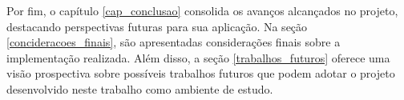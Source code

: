 Por fim, o capítulo \ref{cap_conclusao} consolida os avanços alcançados no projeto, destacando perspectivas futuras para sua aplicação. Na seção \ref{concideracoes_finais}, são apresentadas considerações finais sobre a implementação realizada. Além disso, a seção \ref{trabalhos_futuros} oferece uma visão prospectiva sobre possíveis trabalhos futuros que podem adotar o projeto desenvolvido neste trabalho como ambiente de estudo.


